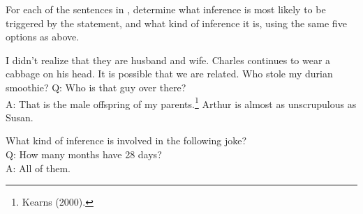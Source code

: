 {For each of the sentences in , determine what inference is most likely to be triggered by the statement, and what kind of inference it is, using the same five options as above.

\ea
    \label{ex:8:exercise:5}
\ea%
 I didn’t realize that they are husband and wife.
\ex Charles continues to wear a cabbage on his head.
\ex It is possible that we are related.
\ex  Who stole my durian smoothie?
\ex  Q: Who is that guy over there?\\
A: That is the male offspring of my parents.\footnote{Kearns (2000).}
\ex  Arthur is almost as unscrupulous as Susan.
\z
\z


\ea%
What kind of inference is involved in the following joke?\\
Q: How many months have 28 days? \\
A: All of them.    
\z

}

